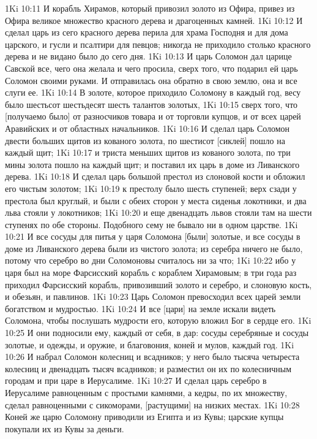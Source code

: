 1Ki 10:11  И корабль Хирамов, который привозил золото из Офира, привез из Офира великое множество красного дерева и драгоценных камней.
1Ki 10:12  И сделал царь из сего красного дерева перила для храма Господня и для дома царского, и гусли и псалтири для певцов; никогда не приходило столько красного дерева и не видано было до сего дня.
1Ki 10:13  И царь Соломон дал царице Савской все, чего она желала и чего просила, сверх того, что подарил ей царь Соломон своими руками. И отправилась она обратно в свою землю, она и все слуги ее.
1Ki 10:14  В золоте, которое приходило Соломону в каждый год, весу было шестьсот шестьдесят шесть талантов золотых,
1Ki 10:15  сверх того, что [получаемо было] от разносчиков товара и от торговли купцов, и от всех царей Аравийских и от областных начальников.
1Ki 10:16  И сделал царь Соломон двести больших щитов из кованого золота, по шестисот [сиклей] пошло на каждый щит;
1Ki 10:17  и триста меньших щитов из кованого золота, по три мины золота пошло на каждый щит; и поставил их царь в доме из Ливанского дерева.
1Ki 10:18  И сделал царь большой престол из слоновой кости и обложил его чистым золотом;
1Ki 10:19  к престолу было шесть ступеней; верх сзади у престола был круглый, и были с обеих сторон у места сиденья локотники, и два льва стояли у локотников;
1Ki 10:20  и еще двенадцать львов стояли там на шести ступенях по обе стороны. Подобного сему не бывало ни в одном царстве.
1Ki 10:21  И все сосуды для питья у царя Соломона [были] золотые, и все сосуды в доме из Ливанского дерева были из чистого золота; из серебра ничего не было, потому что серебро во дни Соломоновы считалось ни за что;
1Ki 10:22  ибо у царя был на море Фарсисский корабль с кораблем Хирамовым; в три года раз приходил Фарсисский корабль, привозивший золото и серебро, и слоновую кость, и обезьян, и павлинов.
1Ki 10:23  Царь Соломон превосходил всех царей земли богатством и мудростью.
1Ki 10:24  И все [цари] на земле искали видеть Соломона, чтобы послушать мудрости его, которую вложил Бог в сердце его.
1Ki 10:25  И они подносили ему, каждый от себя, в дар: сосуды серебряные и сосуды золотые, и одежды, и оружие, и благовония, коней и мулов, каждый год.
1Ki 10:26  И набрал Соломон колесниц и всадников; у него было тысяча четыреста колесниц и двенадцать тысяч всадников; и разместил он их по колесничным городам и при царе в Иерусалиме.
1Ki 10:27  И сделал царь серебро в Иерусалиме равноценным с простыми камнями, а кедры, по их множеству, сделал равноценными с сикоморами, [растущими] на низких местах.
1Ki 10:28  Коней же царю Соломону приводили из Египта и из Кувы; царские купцы покупали их из Кувы за деньги.
